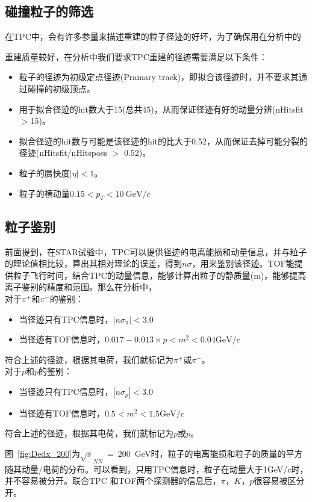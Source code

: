 \subsection{碰撞粒子的筛选}
在TPC中，会有许多参量来描述重建的粒子径迹的好坏，为了确保用在分析中的


重建质量较好，在分析中我们要求TPC重建的径迹需要满足以下条件：
\begin{itemize}
\item 粒子的径迹为初级定点径迹(Pramary track)，即拟合该径迹时，并不要求其通过碰撞的初级顶点。
\item 用于拟合径迹的hit数大于15(总共45)，从而保证径迹有好的动量分辨(nHitsfit $>$15)。
\item 拟合径迹的hit数与可能是该径迹的hit的比大于0.52，从而保证去掉可能分裂的径迹(nHitsfit/nHitsposs $>$ 0.52)。
\item 粒子的赝快度$|\eta|<1$。
\item 粒子的横动量$0.15<p_{T}<10~\mathrm{GeV}/\mathit{c}$
\end{itemize}


\subsection{粒子鉴别}
前面提到，在STAR试验中，TPC可以提供径迹的电离能损和动量信息，并与粒子的理论值相比较，算出其相对理论的误差，得到$n\sigma$，用来鉴别该径迹。TOF能提供粒子飞行时间，结合TPC的动量信息，能够计算出粒子的静质量(m)，能够提高离子鉴别的精度和范围。那么在分析中，\\对于$\pi^{+}$和$\pi^{-}$的鉴别：
\begin{itemize}
\item 当径迹只有TPC信息时，$|n\sigma_{\pi}| < 3.0 $
\item 当径迹有TOF信息时，$0.017-0.013 \times p < m^{2} <0.04 \mathrm{GeV}/\mathit{c} $
\end{itemize}
符合上述的径迹，根据其电荷，我们就标记为$\pi^{+}$或$\pi^{-}$。
\\对于$p$和$\overline{p}$的鉴别：
\begin{itemize}
\item 当径迹只有TPC信息时，$|n\sigma_{p}| < 3.0$
\item 当径迹有TOF信息时，$0.5 < m^{2} < 1.5 \mathrm{GeV}/\mathit{c}$
\end{itemize}

符合上述的径迹，根据其电荷，我们就标记为$p$或$\overline{p}$。

图~\ref{fig:Dedx_200}为$\sqrt{s}_{NN}$~=~200~GeV时，粒子的电离能损和粒子的质量的平方随其动量/电荷的分布。可以看到，只用TPC信息时，粒子在动量大于1GeV/c时，并不容易被分开。联合TPC 和TOF两个探测器的信息后，$\pi$，$K$，$p$很容易被区分开。

